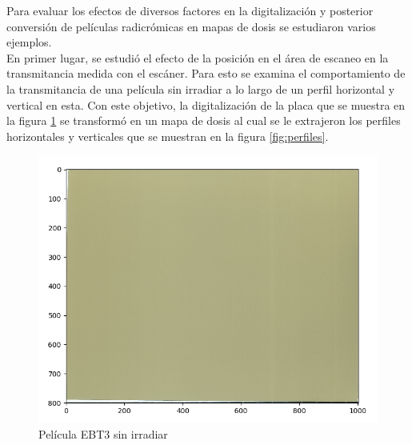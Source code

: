 Para evaluar los efectos de diversos factores en la digitalización y posterior conversión de películas radicrómicas en mapas de dosis se estudiaron varios ejemplos. \\

En primer lugar, se estudió el efecto de la posición en el área de escaneo en la transmitancia medida con el escáner. Para esto se examina el comportamiento de la transmitancia de una película sin irradiar a lo largo de un perfil horizontal y vertical en esta. Con este objetivo, la digitalización de la placa que se muestra en la figura \ref{fig:fondoCero} se transformó en un mapa de dosis al cual se le extrajeron los perfiles horizontales y verticales que se muestran en la figura \ref{fig:perfiles}.\\

\begin{figure}[H]
	\centering
	\includegraphics[width=0.7\linewidth]{images/imagenFondoCero.png}
	\caption{Película EBT3 sin irradiar }
	\label{fig:fondoCero}
\end{figure}

